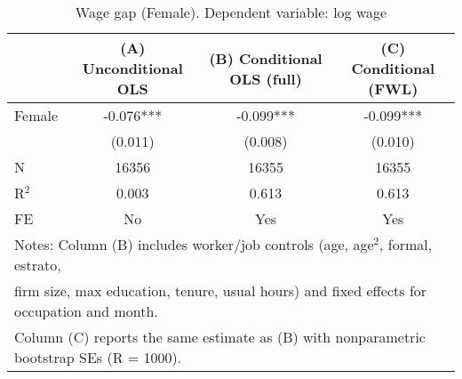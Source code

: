 \begin{table}[!htbp]\centering
\caption{Wage gap (Female). Dependent variable: log wage}\label{tab:wagegap}
\begin{tabular}{lccc}
\toprule
 & (A) Unconditional OLS & (B) Conditional OLS (full) & (C) Conditional (FWL) \\
\midrule
Female & -0.076*** & -0.099*** & -0.099*** \\
 & (0.011) & (0.008) & (0.010) \\
\midrule
N & 16356 & 16355 & 16355 \\
R$^2$ & 0.003 & 0.613 & 0.613 \\
FE & No & Yes & Yes \\
\bottomrule
\multicolumn{4}{l}{\footnotesize Notes: Column (B) includes worker/job controls (age, age$^2$, formal, estrato,} \\
\multicolumn{4}{l}{\footnotesize firm size, max education, tenure, usual hours) and fixed effects for occupation and month.} \\
\multicolumn{4}{l}{\footnotesize Column (C) reports the same estimate as (B) with nonparametric bootstrap SEs (R = 1000).} \\
\end{tabular}
\end{table}
